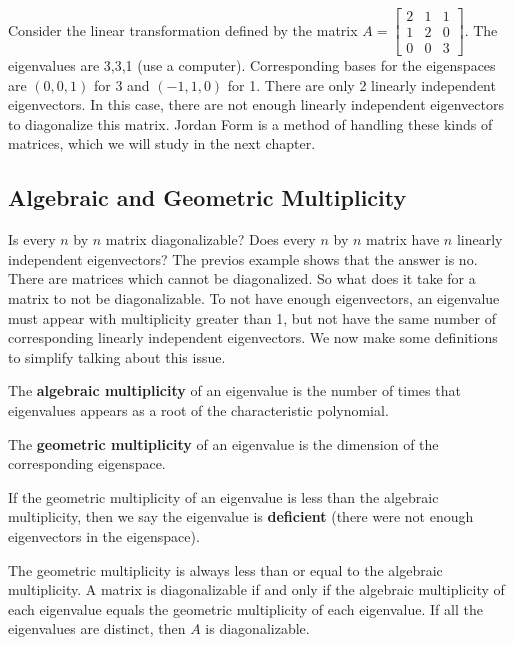 \begin{example} \label{multiplicityex2}
Consider the linear transformation defined by the matrix
$A=  
\begin{bmatrix}
 2 & 1 & 1 \\
 1 & 2 & 0 \\
 0 & 0 & 3
\end{bmatrix} 
$. 
The eigenvalues are 3,3,1 (use a computer). Corresponding bases for the eigenspaces are $(0,0,1)$ for 3 and $(-1,1,0)$ for 1. There are only 2 linearly independent eigenvectors.  In this case, there are not enough linearly independent eigenvectors to diagonalize this matrix.  Jordan Form is a method of handling these kinds of matrices, which we will study in the next chapter. 
\end{example}


\subsection{Algebraic and Geometric Multiplicity}
Is every $n$ by $n$ matrix diagonalizable?  
Does every $n$ by $n$ matrix have $n$ linearly independent eigenvectors? 
The previos example shows that the answer is no. 
There are matrices which cannot be diagonalized. 
So what does it take for a matrix to not be diagonalizable. 
To not have enough eigenvectors, 
an eigenvalue must appear with multiplicity greater than 1, but not have the same number of corresponding linearly independent eigenvectors. We now make some definitions to simplify talking about this issue.
\begin{definition}
The \textbf{algebraic multiplicity} of an eigenvalue is the number of times that eigenvalues appears as a root of the characteristic polynomial.

The \textbf{geometric multiplicity} of an eigenvalue is the dimension of the corresponding eigenspace. 

If the geometric multiplicity of an eigenvalue is less than the algebraic multiplicity, then we say the eigenvalue is \textbf{deficient} (there were not enough eigenvectors in the eigenspace).
\end{definition}


\begin{theorem}
The geometric multiplicity is always less than or equal to the algebraic multiplicity.  A matrix is diagonalizable if and only if the algebraic multiplicity of each eigenvalue equals the geometric multiplicity of each eigenvalue. 
If all the eigenvalues are distinct, then $A$ is diagonalizable.
\end{theorem}

